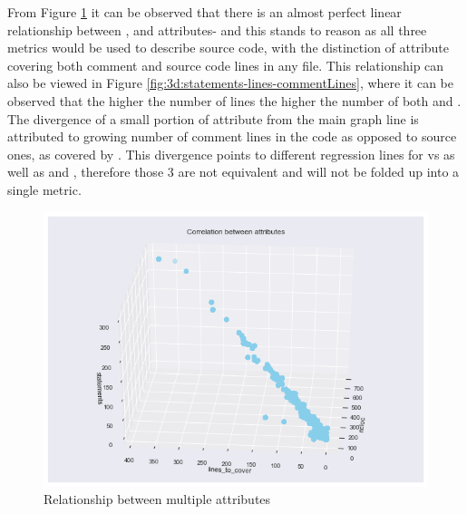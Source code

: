 \begin{enumerate}
From Figure \ref{fig:3d:ncloc-linesToCover-statements} it can be observed that there is an almost perfect linear relationship between \statements{}, \ncloc{} and \lines{} attributes- and this stands to reason as all three metrics would be used to describe source code, with the distinction of \lines{} attribute covering both comment and source code lines in any file. This relationship can also be viewed in Figure \ref{fig:3d:statements-lines-commentLines}, where it can be observed that the higher the number of lines the higher the number of both \statements{} and \commentLines{}. The divergence of a small portion of \lines{} attribute from the main graph line is attributed to growing number of comment lines in the code as opposed to source ones, as covered by \statements{}. This divergence points to different regression lines for \lines{} vs\commentLines{} as well as \lines{} and \statements{}, therefore those 3 are not equivalent and will not be folded up into a single metric.
\begin{figure}[!h]
    \centering
    \includegraphics[scale=0.65]{Figures/three-d/Correlation-between-attributes-ncloc-lines_to_cover-statements.png}
    \caption{Relationship between multiple attributes}
    \label{fig:3d:ncloc-linesToCover-statements}
\end{figure}


\end{enumerate}
